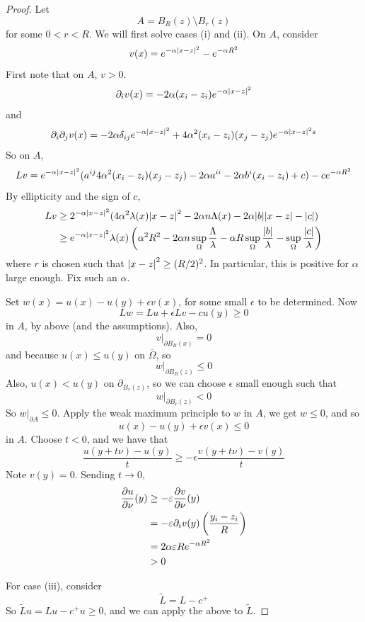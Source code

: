 \documentclass{article}
\begin{document}
\begin{proof}
    Let
    \[A = B_R(z) \setminus B_r(z)\]
    for some \(0 < r < R\). We will first solve cases (i) and (ii). On \(A\), consider
    \[v(x) = e^{-\alpha\abs{x - z}^2} - e^{-\alpha R^2}\]
    First note that on \(A\), \(v > 0\).
    \[\partial_i v(x) = -2\alpha(x_i - z_i)e^{-\alpha\abs{x - z}^2}\]
    and
    \[\partial_i\partial_jv(x) = -2\alpha\delta_{ij}e^{-\alpha\abs{x - z}^2} + 4\alpha^2(x_i - z_i)(x_j - z_j)e^{-\alpha\abs{x - z}^2s}\]
    So on \(A\),
    \[Lv = e^{-\alpha \abs{x - z}^2}(a^{ij}4\alpha^2(x_i - z_i)(x_j - z_j) - 2\alpha a^{ii} - 2\alpha b^i(x_i - z_i) + c) - ce^{-\alpha R^2}\]
    By ellipticity and the sign of \(c\),
    \begin{align*}
        Lv &\ge 2^{-\alpha\abs{x - z}^2}(4\alpha^2 \lambda(x)\abs{x - z}^2 - 2\alpha n \Lambda(x) - 2\alpha \abs{b}\abs{x - z} - \abs{c}) \\
        &\ge e^{-\alpha\abs{x - z}^2}\lambda(x)\left(\alpha^2 R^2 - 2\alpha n \sup_\Omega\frac{\Lambda}{\lambda} - \alpha R \sup_\Omega \frac{\abs{b}}{\lambda} - \sup_\Omega \frac{\abs{c}}{\lambda}\right)
    \end{align*}
    where \(r\) is chosen such that \(\abs{x - z}^2 \ge (R/2)^2\). In particular, this is positive for \(\alpha\) large enough. Fix such an \(\alpha\).
\lec

    Set \(w(x) = u(x) - u(y) + \epsilon v(x)\), for some small \(\epsilon\) to be determined. Now
    \[Lw = Lu + \epsilon Lv - cu(y) \ge 0\]
    in \(A\), by above (and the assumptions). Also, 
    \[v\vert_{\partial B_R(x)} = 0\]
    and because \(u(x) \le u(y)\) on \(\overline\Omega\), so
    \[w\vert_{\partial B_R(z)} \le 0\]
    Also, \(u(x) < u(y)\) on \(\partial_{B_r(z)}\), so we can choose \(\epsilon\) small enough such that
    \[w\vert_{\partial B_r(z)} < 0\]
    So \(w \vert_{\partial A} \le 0\). Apply the weak maximum principle to \(w\) in \(A\), we get \(w \le 0\), and so
    \[u(x) - u(y) + \epsilon v(x) \le 0\]
    in \(A\). Choose \(t < 0\), and we have that
    \[\frac{u(y + t\nu) - u(y)}{t} \ge -\epsilon \frac{v(y + t\nu) - v(y)}{t}\]
    Note \(v(y) = 0\). Sending \(t \to 0\),
    \begin{align*}
        {\pdv{u}{\nu}}(y) &\ge -\varepsilon{\pdv{v}{\nu}}(y) \\
        &= -\varepsilon\partial_i v(y)\left(\frac{y_i - z_i}{R}\right) \\
        &= 2\alpha\varepsilon R e^{-\alpha R^2} \\
        & > 0
    \end{align*}

    For case (iii), consider
    \[\widetilde L = L - c^+\]
    So \(\widetilde L u = Lu - c^+ u \ge 0\), and we can apply the above to \(\widetilde L\).
\end{proof}
\end{document}
